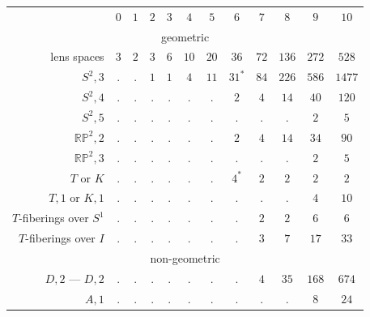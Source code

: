 \documentclass[10pt]{article}      %
\newcommand{\matRP} {\ensuremath {\mathbb{RP}}}
\begin{document}
\begin{table}
  \begin{center}
    \begin{tabular}{rccccccccccc}
      & $0$ & $1$ & $2$ & $3$ & $4$ & $5$ & $6$ & $7$ & $8$ & $9$ & $10$ \\
      
      \multicolumn{12}{c}{geometric\phantom{\Big|}} \\


      lens spaces &
      $3$ & $2$ & $3$ & $6$ & $10$ & $20$ & $36$ & $72$ & $136$ & $272$ & $528$ \\

			$S^2, 3$
			& . & . & $1$ & $1$ & $4$ & $11$ & $31^*$ & $84$ & $226$ & $586$ & $1477$ \\

			$S^2, 4$ 
			& . & . & .   & .   & .   & .    & $2$    & $4$  & $14$  & $40$  & $120$ \\

			$S^2, 5$ 
			& . & . & .   & .   & .   & .    & .      & .    & .     & $2$   & $5$ \\

			$\matRP^2, 2$ 
			& . & . & .   & .   & .   & .    & $2$    & $4$  & $14$  & $34$  & $90$ \\

			$\matRP^2, 3$ 
			& . & . & .   & .   & .   & .    & .      & .    & .     & $2$   & $5$ \\

			$T$ or $K$  
			& . & . & .   & .   & .   & .    & $4^*$  & $2$  & $2$   & $2$   & $2$ \\

			$T,1$ or $K,1$  
			& . & . & .   & .   & .   & .    & .      & .    & .     & $4$   & $10$\\

			$T$-fiberings over $S^1$  
			& . & . & .   & .   & .   & .    & .      & $2$  & $2$   & $6$   & $6$\\

			$T$-fiberings over $I$ 
			& . & . & .   & .   & .   & .    & .      & $3$  & $7$   & $17$  & $33$\\

      \multicolumn{12}{c}{non-geometric\phantom{\Big|}} \\

			$D, 2$ --- $D, 2$
			& . & . & .   & .   & .   & .    & .      & $4$  & $35$  & $168$ & $674$\\

			$A, 1$ 
			& . & . & .   & .   & .   & .    & .      & .    & .     & $8$   & $24$ \\


\end{tabular}
\end{center}
\end{table}
\end{document}
